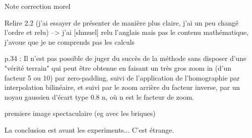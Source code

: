 Note correction morel


Relire 2.2 (j’ai essayer de présenter de manière plus claire, j’ai un peu changé l’ordre et relu)
--> j'ai [shmuel] relu l'anglais mais pas le contenu mathématique, j'avoue que je ne comprends pas les calculs


p.34 : Il n'est pas possible de juger du succès de la méthode sans disposer d'une "vérité terrain" qui peut être obtenue en faisant un très gros zoom in (d'un facteur 5 ou 10) par zero-padding, suivi de l'application de l'homographie par interpolation bilinéaire, et suivi par le zoom arrière du facteur inverse, par un noyau gaussien d'écart type 0.8 n, où n est  le facteur de zoom.


premiere image spectaculaire (eg avec les briques)


La conclusion est avant les experiments... C'est étrange.
